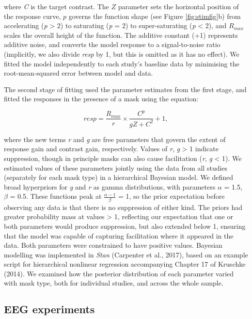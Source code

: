 \documentclass[]{article}
\begin{document}
where \emph{C} is the target contrast. The \(Z\) parameter sets the horizontal position of the response curve, \(p\) governs the function shape (see Figure \ref{fig:stimfig}b) from accelerating (\emph{p} \textgreater{} 2) to saturating (\emph{p} = 2) to super-saturating (\emph{p} \textless{} 2), and \(R_{max}\) scales the overall height of the function. The additive constant (+1) represents additive noise, and converts the model response to a signal-to-noise ratio (implicitly, we also divide \emph{resp} by 1, but this is omitted as it has no effect). We fitted the model independently to each study's baseline data by minimising the root-mean-squared error between model and data.

The second stage of fitting used the parameter estimates from the first stage, and fitted the responses in the presence of a mask using the equation:

\begin{equation}
\label{eq:GC2}
resp = \frac{R_{max}}{r} \times \frac{C^p}{gZ + C^2} + 1,
\end{equation}

where the new terms \emph{r} and \emph{g} are free parameters that govern the extent of response gain and contrast gain, respectively. Values of \emph{r}, \emph{g} \textgreater{} 1 indicate suppression, though in principle masks can also cause facilitation (\emph{r}, \emph{g} \textless{} 1). We estimated values of these parameters jointly using the data from all studies (separately for each mask type) in a hierarchical Bayesian model. We defined broad hyperpriors for \emph{g} and \emph{r} as gamma distributions, with parameters \(\alpha\) = 1.5, \(\beta\) = 0.5. These functions peak at \(\frac{\alpha-1}{\beta}\) = 1, so the prior expectation before observing any data is that there is no suppression of either kind. The priors had greater probability mass at values \textgreater{} 1, reflecting our expectation that one or both parameters would produce suppression, but also extended below 1, ensuring that the model was capable of capturing facilitation where it appeared in the data. Both parameters were constrained to have positive values. Bayesian modelling was implemented in \emph{Stan} (Carpenter et al., 2017), based on an example script for hierarchical nonlinear regression accompanying Chapter 17 of Kruschke (2014). We examined how the posterior distribution of each parameter varied with mask type, both for individual studies, and across the whole sample.

\hypertarget{eeg-experiments}{%
\subsection{EEG experiments}\label{eeg-experiments}}
\end{document}
